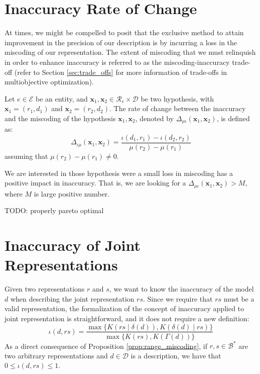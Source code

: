 %
%

\section{Inaccuracy Rate of Change}

At times, we might be compelled to posit that the exclusive method to attain improvement in the precision of our description is by incurring a loss in the miscoding of our representation. The extent of miscoding that we must relinquish in order to enhance inaccuracy is referred to as the miscoding-inaccuracy trade-off (refer to Section \ref{sec:trade_offs} for more information of trade-offs in multiobjective optimization).

\begin{definition}
Let $e \in \mathcal{E}$ be an entity, and $\mathbf{x}_1, \mathbf{x}_2 \in \mathcal{R}_e \times \mathcal{D}$ be two hypothesis, with $\mathbf{x}_1 = (r_1, d_1)$ and $\mathbf{x}_2 = (r_2, d_2)$. The rate of change between the inaccuracy and the miscoding of the hypothesis $\mathbf{x}_1, \mathbf{x}_2$, denoted by $\Delta_{\mu \iota} ( \mathbf{x}_1, \mathbf{x}_2 )$, is defined as:
\[
\Delta_{\iota \mu} ( \mathbf{x}_1, \mathbf{x}_2 ) = \frac{\iota(d_1, r_1) - \iota(d_2, r_2)}{\mu(r_2) - \mu(r_1)}
\] 
assuming that $\mu(r_2) - \mu(r_1) \neq 0$.
\end{definition}

We are interested in those hypothesis were a small loss in miscoding has a positive impact in inaccuracy. That is, we are looking for a $\Delta_{\mu \iota} ( \mathbf{x}_1, \mathbf{x}_2 ) > M$, where $M$ is large positive number.


{\color{red} TODO: properly pareto optimal}

%
%

\section{Inaccuracy of Joint Representations}

Given two representations $r$ and $s$, we want to know the inaccuracy of the model $d$ when describing the joint representation $rs$. Since we require that $rs$ must be a valid representation, the formalization of the concept of inaccuracy applied to joint representation is straightforward, and it does not require a new definition:
\[
\iota(d, rs) = \frac{ \max\{ K \left(rs \mid \delta(d) \right), K \left( \delta(d) \mid rs \right) \} } { \max\{ K(rs), K \left(\Gamma(d) \right) \} }
\]
As a direct consequence of Proposition \ref{prop:range_miscoding}, if $r, s \in \mathcal{B}^\ast$ are two arbitrary representations and $d \in \mathcal{D}$ is a description, we have that $0 \leq \iota(d, rs) \leq 1$.


